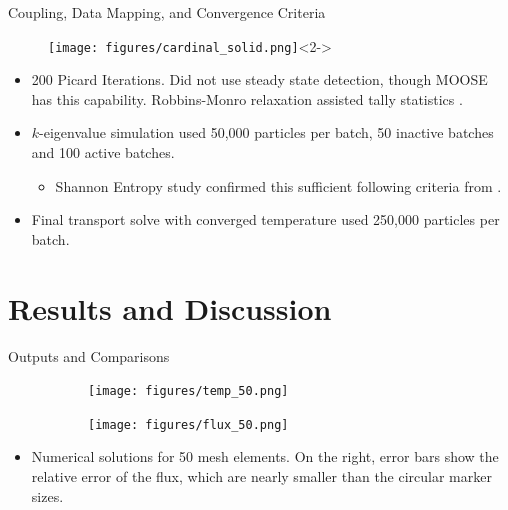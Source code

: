 \documentclass[9pt,t]{beamer}
\begin{document}
\begin{frame}{Coupling, Data Mapping, and Convergence Criteria}
    \pause
    \begin{figure}[T]
        \centering
        \texttt{[image: figures/cardinal\_solid.png]}<2->
    \end{figure}
    \begin{itemize}
        \item <3-> 200 Picard Iterations.  Did not use steady state detection, though MOOSE has this capability. Robbins-Monro relaxation assisted tally statistics \cite{dufek}.
        \item <4-> $k$-eigenvalue simulation used 50,000 particles per batch, 50 inactive batches and 100 active batches.
        \begin{itemize}
            \item <5-> Shannon Entropy study confirmed this sufficient following criteria from \cite{brown-entropy-2006}.
        \end{itemize}
        \item <6-> Final transport solve with converged temperature used 250,000 particles per batch.
    \end{itemize}
\end{frame}


\section{Results and Discussion}
\begin{frame}{Outputs and Comparisons}
    \begin{figure}[T]
        \hspace*{-1cm}
        \begin{subfigure}[b]{0.495\linewidth}
            \centering
            \texttt{[image: figures/temp\_50.png]}
        \end{subfigure}\hspace*{0.6cm}
        \begin{subfigure}[b]{0.495\linewidth}
        \centering
            \texttt{[image: figures/flux\_50.png]}
        \end{subfigure}
    \end{figure}
    \begin{itemize}
        \item Numerical solutions for 50 mesh elements. On the right, error bars show the relative error of the flux, which are nearly smaller than the circular marker sizes.
    \end{itemize}
\end{frame}
\end{document}
